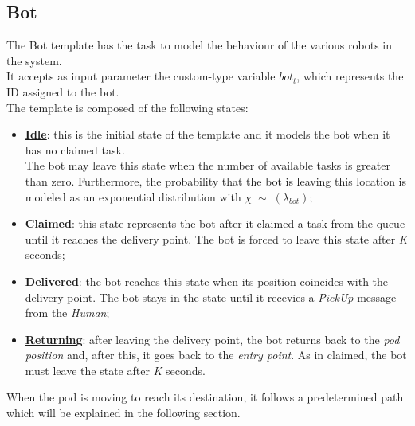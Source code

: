 \documentclass[10pt,a4paper]{article}
\begin{document}
		
		\subsection{Bot}
			The Bot template has the task to model the behaviour of the various robots in the system. \\
			It accepts as input parameter the custom-type variable $bot_t$, which represents the ID assigned to the bot.\\
			The template is composed of the following states:
			\begin{itemize}
				\item \textbf{\underline{Idle}}: this is the initial state of the template and it models the bot when it has no claimed task.\\The bot may leave this state when the number of available tasks is greater than zero. Furthermore, the probability that the bot is leaving this location is modeled as an exponential distribution with $\chi\;\sim\;(\lambda_{bot})$;
				\item \textbf{\underline{Claimed}}: this state represents the bot after it claimed a task from the queue until it reaches the delivery point. The bot is forced to leave this state after \emph{K} seconds;
				\item \textbf{\underline{Delivered}}: the bot reaches this state when its position coincides with the delivery point. The bot stays in the state until it recevies a \emph{PickUp} message from the \emph{Human};
				\item \textbf{\underline{Returning}}: after leaving the delivery point, the bot returns back to the \emph{pod position} and, after this, it goes back to the \emph{entry point}. As in claimed, the bot must leave the state after \emph{K} seconds.
			\end{itemize}
			When the pod is moving to reach its destination, it follows a predetermined path which will be explained in the following section.
			
\end{document}
